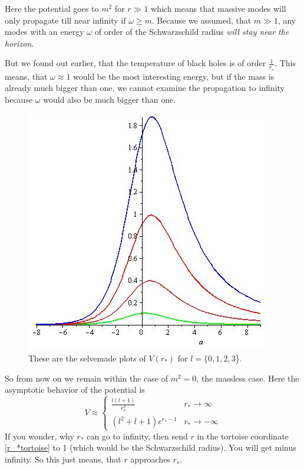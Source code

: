 	Here the potential goes to $m^2$ for $r \gg 1$ which means that massive modes will only propagate till near infinity if $\omega \geq m$. Because we assumed, that $m \gg 1$, any modes with an energy $\omega$ of order of the Schwarzschild radius \textit{will stay near the horizon}. 
	 
	But we found out earlier, that the temperature of black holes is of order $\frac{1}{r_s}$. This means, that $\omega \approx 1$ would be the most interesting energy, but if the mass is already much bigger than one, we cannot examine the propagation to infinity because $\omega$ would also be much bigger than one.
	
	\begin{figure} [tbp]
			\begin{center}
				\includegraphics[scale=0.5]{plots_of_V}
				\caption{These are the selvemade plots of $V(r_*)$ for $l=\{0,1,2,3$\}.} \label{plots_of_V}
			\end{center}
	\end{figure} %
		
	So from now on we remain within the case of $m^2=0$, the massless case.
	Here the asymptotic behavior of the potential is
		\begin{equation} \label{potential_near_infinity}
			V\approx
			\begin{cases}
				\frac{l(l+1)}{r^2_*} &r_* \rightarrow \infty \\
				(l^2 + l + 1) e^{r_*-1} &r_* \rightarrow - \infty
			\end{cases}
		\end{equation}
	If you wonder, why $r_*$ can go to infinity, then send $r$ in the tortoise coordinate \eqref{r_*tortoise} to 1 (which would be the Schwarzschild radius). You will get minus infinity. So this just means, that $r$ approaches $r_s$. 
	
